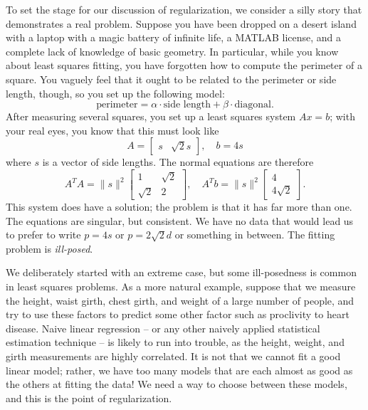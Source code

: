 \documentclass[12pt, leqno]{article} %
\begin{document}
To set the stage for our discussion of regularization, we consider a
silly story that demonstrates a real problem.
Suppose you have been dropped on a desert island with a laptop with a magic
battery of infinite life, a MATLAB license, and a complete lack of
knowledge of basic geometry.  In particular, while you know about
least squares fitting, you have forgotten how to compute the perimeter
of a square.  You vaguely feel that it ought to be related to the
perimeter or side length, though, so you set up the following model:
\[
  \mbox{perimeter} = \alpha \cdot \mbox{side length} + \beta \cdot \mbox{diagonal}.
\]
After measuring several squares, you set up a least squares system
$Ax = b$; with your real eyes, you know that this must look
like
\[
  A = \begin{bmatrix} s & \sqrt{2} s \end{bmatrix}, \quad
  b = 4 s
\]
where $s$ is a vector of side lengths.  The normal equations are
therefore
\[
A^T A = \|s\|^2
\begin{bmatrix} 1 & \sqrt{2} \\ \sqrt{2} & 2 \end{bmatrix}, \quad
A^T b = \|s\|^2
\begin{bmatrix} 4 \\ 4 \sqrt{2} \end{bmatrix}.
\]
This system does have a solution; the problem is that it has far more
than one.  The equations are singular, but consistent.
We have no data that would lead us to prefer to write
$p = 4s$ or $p = 2 \sqrt{2} d$ or something in between.
The fitting problem is {\em ill-posed}.

We deliberately started with an extreme case, but some ill-posedness
is common in least squares problems.  As a more natural example,
suppose that we measure the height, waist girth, chest girth, and
weight of a large number of people, and try to use these factors to
predict some other factor such as proclivity to heart disease.  Naive
linear regression -- or any other naively applied statistical
estimation technique -- is likely to run into trouble, as the height,
weight, and girth measurements are highly correlated.  It is not that
we cannot fit a good linear model; rather, we have too many models
that are each almost as good as the others at fitting the data!  We
need a way to choose between these models, and this is the point of
regularization.
\end{document}
